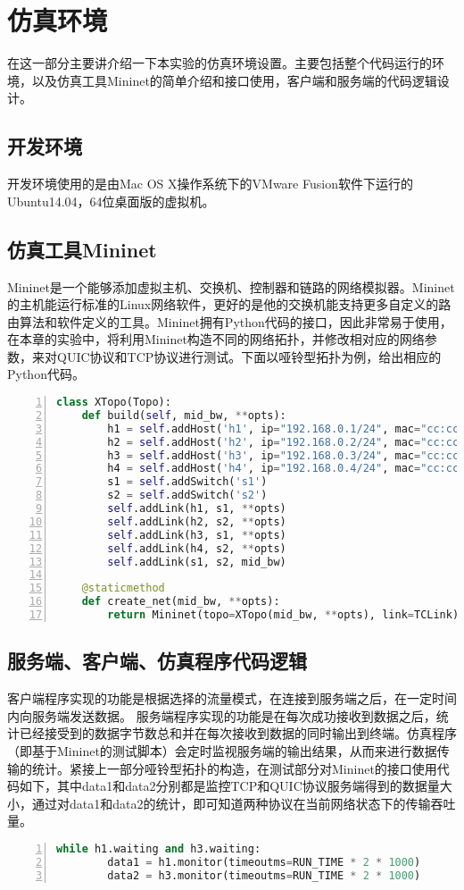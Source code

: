 \section{仿真环境}
在这一部分主要讲介绍一下本实验的仿真环境设置。主要包括整个代码运行的环境，以及仿真工具Mininet的简单介绍和接口使用，客户端和服务端的代码逻辑设计。
\subsection{开发环境}
开发环境使用的是由Mac OS X操作系统下的VMware Fusion软件下运行的Ubuntu14.04，64位桌面版的虚拟机。

\subsection{仿真工具Mininet}
Mininet是一个能够添加虚拟主机、交换机、控制器和链路的网络模拟器。Mininet的主机能运行标准的Linux网络软件，更好的是他的交换机能支持更多自定义的路由算法和软件定义的工具。Mininet拥有Python代码的接口，因此非常易于使用，在本章的实验中，将利用Mininet构造不同的网络拓扑，并修改相对应的网络参数，来对QUIC协议和TCP协议进行测试。下面以哑铃型拓扑为例，给出相应的Python代码。

\begin{lstlisting}[language={python},numbers=left]
class XTopo(Topo):
    def build(self, mid_bw, **opts):
        h1 = self.addHost('h1', ip="192.168.0.1/24", mac="cc:cc:cc:cc:cc:01")
        h2 = self.addHost('h2', ip="192.168.0.2/24", mac="cc:cc:cc:cc:cc:02")
        h3 = self.addHost('h3', ip="192.168.0.3/24", mac="cc:cc:cc:cc:cc:03")
        h4 = self.addHost('h4', ip="192.168.0.4/24", mac="cc:cc:cc:cc:cc:04")
        s1 = self.addSwitch('s1')
        s2 = self.addSwitch('s2')
        self.addLink(h1, s1, **opts)
        self.addLink(h2, s2, **opts)
        self.addLink(h3, s1, **opts)
        self.addLink(h4, s2, **opts)
        self.addLink(s1, s2, mid_bw)

    @staticmethod
    def create_net(mid_bw, **opts):
        return Mininet(topo=XTopo(mid_bw, **opts), link=TCLink)
\end{lstlisting}

\subsection{服务端、客户端、仿真程序代码逻辑}
客户端程序实现的功能是根据选择的流量模式，在连接到服务端之后，在一定时间内向服务端发送数据。
服务端程序实现的功能是在每次成功接收到数据之后，统计已经接受到的数据字节数总和并在每次接收到数据的同时输出到终端。仿真程序（即基于Mininet的测试脚本）会定时监视服务端的输出结果，从而来进行数据传输的统计。紧接上一部分哑铃型拓扑的构造，在测试部分对Mininet的接口使用代码如下，其中data1和data2分别都是监控TCP和QUIC协议服务端得到的数据量大小，通过对data1和data2的统计，即可知道两种协议在当前网络状态下的传输吞吐量。
\begin{lstlisting}[language={python},numbers=left]
    while h1.waiting and h3.waiting:
        data1 = h1.monitor(timeoutms=RUN_TIME * 2 * 1000)
        data2 = h3.monitor(timeoutms=RUN_TIME * 2 * 1000)
\end{lstlisting}

